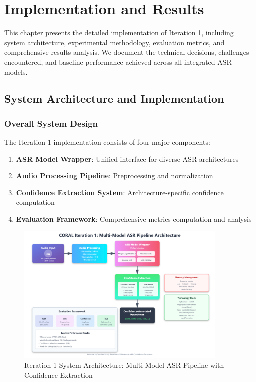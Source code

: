 
\chapter{Implementation and Results}
\label{sec:implementation}

This chapter presents the detailed implementation of Iteration 1, including system architecture, experimental methodology, evaluation metrics, and comprehensive results analysis. We document the technical decisions, challenges encountered, and baseline performance achieved across all integrated ASR models.

\section{System Architecture and Implementation}

\subsection{Overall System Design}

The Iteration 1 implementation consists of four major components:

\begin{enumerate}
    \item \textbf{ASR Model Wrapper}: Unified interface for diverse ASR architectures
    \item \textbf{Audio Processing Pipeline}: Preprocessing and normalization
    \item \textbf{Confidence Extraction System}: Architecture-specific confidence computation
    \item \textbf{Evaluation Framework}: Comprehensive metrics computation and analysis
\end{enumerate}

\begin{figure}[H]
    \centering
    \includegraphics[width=0.9\textwidth]{ThesisFigs/system_architecture.png}
    \caption{Iteration 1 System Architecture: Multi-Model ASR Pipeline with Confidence Extraction}
    \label{fig:system_arch}
\end{figure}


